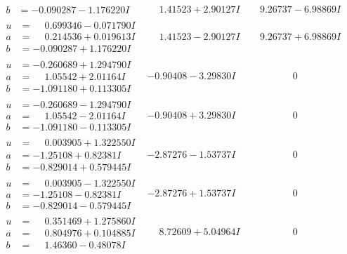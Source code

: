 \documentclass[1p]{elsarticle_modified}
\theoremstyle{definition}
\begin{document}
$$\begin{array}{c|c|c}
\begin{aligned}
b &= -0.090287 - 1.176220 I\end{aligned}
 & \phantom{-}1.41523 + 2.90127 I & \phantom{-}9.26737 - 6.98869 I \\ \hline\begin{aligned}
u &= \phantom{-}0.699346 - 0.071790 I \\
a &= \phantom{-}0.214536 + 0.019613 I \\
b &= -0.090287 + 1.176220 I\end{aligned}
 & \phantom{-}1.41523 - 2.90127 I & \phantom{-}9.26737 + 6.98869 I \\ \hline\begin{aligned}
u &= -0.260689 + 1.294790 I \\
a &= \phantom{-}1.05542 + 2.01164 I \\
b &= -1.091180 + 0.113305 I\end{aligned}
 & -0.90408 - 3.29830 I & \phantom{-0.000000 } 0 \\ \hline\begin{aligned}
u &= -0.260689 - 1.294790 I \\
a &= \phantom{-}1.05542 - 2.01164 I \\
b &= -1.091180 - 0.113305 I\end{aligned}
 & -0.90408 + 3.29830 I & \phantom{-0.000000 } 0 \\ \hline\begin{aligned}
u &= \phantom{-}0.003905 + 1.322550 I \\
a &= -1.25108 + 0.82381 I \\
b &= -0.829014 + 0.579445 I\end{aligned}
 & -2.87276 - 1.53737 I & \phantom{-0.000000 } 0 \\ \hline\begin{aligned}
u &= \phantom{-}0.003905 - 1.322550 I \\
a &= -1.25108 - 0.82381 I \\
b &= -0.829014 - 0.579445 I\end{aligned}
 & -2.87276 + 1.53737 I & \phantom{-0.000000 } 0 \\ \hline\begin{aligned}
u &= \phantom{-}0.351469 + 1.275860 I \\
a &= \phantom{-}0.804976 + 0.104885 I \\
b &= \phantom{-}1.46360 - 0.48078 I\end{aligned}
 & \phantom{-}8.72609 + 5.04964 I & \phantom{-0.000000 } 0 \\ \hline\begin{aligned}

\end{aligned}
\end{array}$$
\end{document}
